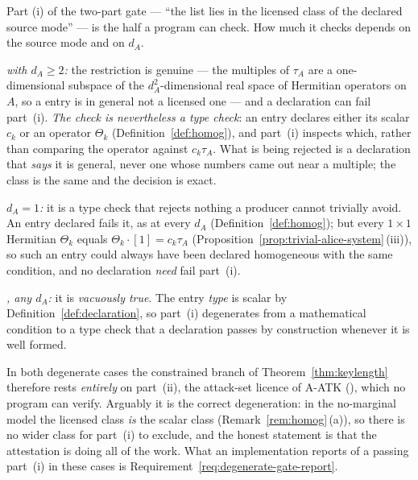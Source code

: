 \begin{remark}\label{rem:cgate}
Part (i) of the two-part gate --- ``the list lies in the licensed class
of the declared source mode'' --- is the half a program can check. How
much it checks depends on the source mode and on $d_A$.

\emph{ with $d_A\ge2$:} the restriction is genuine
--- the multiples of $\tau_A$ are a one-dimensional subspace of the
$d_A^2$-dimensional real space of Hermitian operators on $A$, so a
 entry is in general not a licensed one --- and a declaration
can fail part~(i). \emph{The check is nevertheless a \emph{type} check}: an
entry declares either its scalar $c_k$ or an operator $\Theta_k$
(Definition~\ref{def:homog}), and part~(i) inspects which, rather than
comparing the operator against $c_k\tau_A$. What is being rejected is a
declaration that \emph{says} it is general, never one whose numbers came out
near a multiple; the class is the same and the decision is exact.

\emph{$d_A=1$:} it is a type check that rejects nothing a producer cannot
trivially avoid. An entry declared  fails it, as at every
$d_A$ (Definition~\ref{def:homog}); but every $1\times1$ Hermitian
$\Theta_k$ equals $\Theta_k\cdot[1]=c_k\tau_A$
(Proposition~\ref{prop:trivial-alice-system}\,(iii)), so such an entry could
always have been declared homogeneous with the same condition, and no
declaration \emph{need} fail part~(i).

\emph{, any $d_A$:} it is
\emph{vacuously true}. The entry \emph{type} is scalar by
Definition~\ref{def:declaration}, so part~(i) degenerates from a
mathematical condition to a type check that a declaration passes by
construction whenever it is well formed.

In both degenerate cases the constrained branch of
Theorem~\ref{thm:keylength} therefore rests \emph{entirely} on
part~(ii), the attack-set licence of A-ATK
(), which no program can verify. Arguably it
is the correct degeneration: in the no-marginal model the licensed class
\emph{is} the scalar class (Remark~\ref{rem:homog}\,(a)), so there is no
wider class for part~(i) to exclude, and the honest statement is that the
attestation is doing all of the work. What an implementation reports of a
passing part~(i) in these cases is Requirement~\ref{req:degenerate-gate-report}.


\end{remark}
